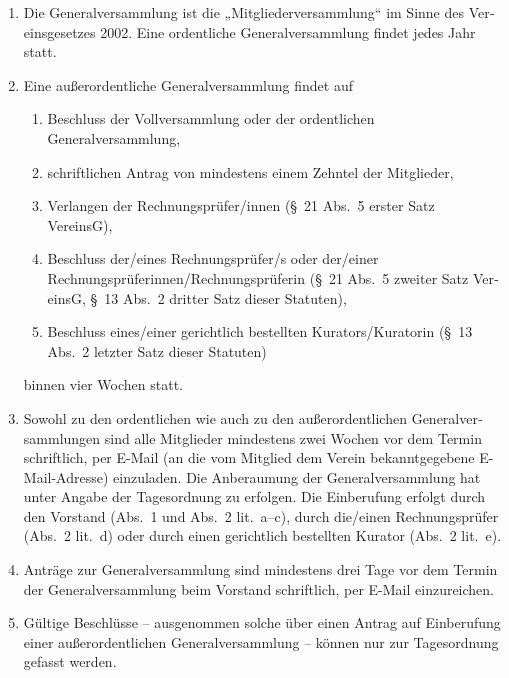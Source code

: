 \begin{otherlanguage}{german}

\begin{enumerate}[statutenenum]
    \item Die Generalversammlung ist die „Mitgliederversammlung“ im Sinne des Vereinsgesetzes 2002.
        Eine ordentliche Generalversammlung findet jedes Jahr statt.

    \item Eine außerordentliche Generalversammlung findet auf
        \begin{enumerate}[statutenenum]
            \item Beschluss der Vollversammlung oder der ordentlichen Generalversammlung,

            \item schriftlichen Antrag von mindestens einem Zehntel der Mitglieder,

            \item Verlangen der Rechnungsprüfer/innen (\S\ 21 Abs.\ 5 erster Satz VereinsG),

            \item Beschluss der/eines Rechnungsprüfer/s oder der/einer Rechnungsprüferinnen/Rechnungsprüferin (\S\ 21 Abs.\ 5 zweiter Satz VereinsG, \S\ 13 Abs.\ 2 dritter Satz dieser Statuten),

            \item Beschluss eines/einer gerichtlich bestellten Kurators/Kuratorin (\S\ 13 Abs.\ 2 letzter Satz dieser Statuten)
        \end{enumerate}
        binnen vier Wochen statt.

    \item Sowohl zu den ordentlichen wie auch zu den außerordentlichen Generalversammlungen sind alle Mitglieder mindestens zwei Wochen vor dem Termin schriftlich, per E-Mail (an die vom Mitglied dem Verein bekanntgegebene E-Mail-Adresse) einzuladen.
        Die Anberaumung der Generalversammlung hat unter Angabe der Tagesordnung zu erfolgen.
        Die Einberufung erfolgt durch den Vorstand (Abs.\ 1 und Abs.\ 2 lit.\ a--c), durch die/einen Rechnungsprüfer (Abs.\ 2 lit.\ d) oder durch einen gerichtlich bestellten Kurator (Abs.\ 2 lit.\ e).

    \item Anträge zur Generalversammlung sind mindestens drei Tage vor dem Termin der Generalversammlung beim Vorstand schriftlich, per E-Mail einzureichen.

    \item Gültige Beschlüsse -- ausgenommen solche über einen Antrag auf Einberufung einer außerordentlichen Generalversammlung -- können nur zur Tagesordnung gefasst werden.


\end{enumerate}
\end{otherlanguage}
